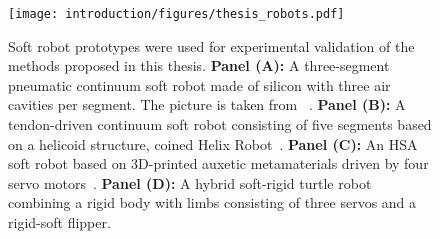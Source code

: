 
\begin{figure}[ht]
    \centering
    \texttt{[image: introduction/figures/thesis\_robots.pdf]}
    \caption{
    Soft robot prototypes were used for experimental validation of the methods proposed in this thesis. 
    \textbf{Panel (A):} A three-segment pneumatic continuum soft robot made of silicon with three air cavities per segment. The picture is taken from ~\citet{katzschmann2019dynamic}.
    \textbf{Panel (B):} A tendon-driven continuum soft robot consisting of five segments based on a helicoid structure, coined Helix Robot~\citep{guan2023trimmed}.
    \textbf{Panel (C):} An \gls{HSA} soft robot based on 3D-printed auxetic metamaterials driven by four servo motors~\citep{lipton2018handedness, truby2021recipe}.
    \textbf{Panel (D):} A hybrid soft-rigid turtle robot combining a rigid body with limbs consisting of three servos and a rigid-soft flipper.
    }
    \label{fig:introduction:thesis_robots}
\end{figure}


